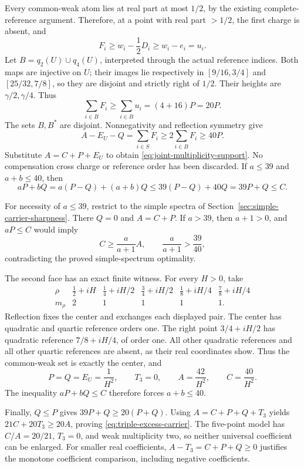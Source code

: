 Every common-weak atom lies at real part at most \(1/2\), by the existing
complete-reference argument. Therefore, at a point with real part \(>1/2\),
the first charge is absent, and
\[
 F_i\ge w_i-\frac12D_i\ge w_i-e_i=u_i.
\]
Let \(B=q_2(U)\cup q_4(U)\), interpreted through the actual reference
indices. Both maps are injective on \(U\); their images lie respectively
in \([9/16,3/4]\) and \([25/32,7/8]\), so they are disjoint and strictly
right of \(1/2\). Their heights are \(\gamma/2,\gamma/4\). Thus
\[
 \sum_{i\in B}F_i\ge\sum_{i\in B}u_i=(4+16)P=20P.
\]
The sets \(B,B^*\) are disjoint. Nonnegativity and reflection symmetry
give
\[
 A-E_U-Q=\sum_{i\in S}F_i
 \ge2\sum_{i\in B}F_i\ge40P.
\]
Substitute \(A=C+P+E_U\) to obtain
\eqref{eq:joint-multiplicity-support}. No compensation cross charge or
reference order has been discarded. If \(a\le39\) and \(a+b\le40\), then
\[
 aP+bQ=a(P-Q)+(a+b)Q
 \le39(P-Q)+40Q=39P+Q\le C.
\]

For necessity of \(a\le39\), restrict to the simple spectra of
Section~\ref{sec:simple-carrier-sharpness}. There \(Q=0\) and \(A=C+P\).
If \(a>39\), then \(a+1>0\), and \(aP\le C\) would imply
\[
 C\ge\frac{a}{a+1}A,\qquad \frac{a}{a+1}>\frac{39}{40},
\]
contradicting the proved simple-spectrum optimality.

The second face has an exact finite witness. For every \(H>0\), take
\[
 \begin{array}{c|ccccc}
 \rho&\frac12+iH&
       \frac14+iH/2&\frac34+iH/2&
       \frac18+iH/4&\frac78+iH/4\\ \hline
 m_\rho&2&1&1&1&1 .
 \end{array}
\]
Reflection fixes the center and exchanges each displayed pair.
The center has quadratic and quartic reference orders one. The right
point \(3/4+iH/2\) has quadratic reference \(7/8+iH/4\), of order one.
All other quadratic references and all other quartic references are
absent, as their real coordinates show. Thus the common-weak set is
exactly the center, and
\[
 P=Q=E_U=\frac1{H^2},\qquad T_3=0,\qquad
 A=\frac{42}{H^2},\qquad C=\frac{40}{H^2}.
\]
The inequality \(aP+bQ\le C\) therefore forces \(a+b\le40\).

Finally, \(Q\le P\) gives
\(39P+Q\ge20(P+Q)\). Using \(A=C+P+Q+T_3\) yields
\(21C+20T_3\ge20A\), proving \eqref{eq:triple-excess-carrier}.
The five-point model has \(C/A=20/21\), \(T_3=0\), and weak multiplicity
two, so neither universal coefficient can be enlarged.
For smaller real coefficients, \(A-T_3=C+P+Q\ge0\) justifies the
monotone coefficient comparison, including negative coefficients.


